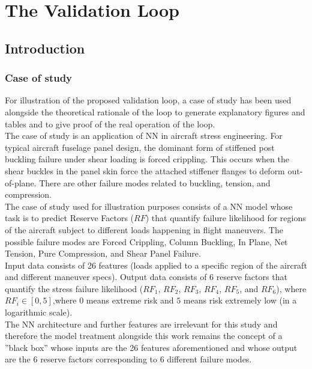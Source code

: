 \chapter{The Validation Loop}
%
\label{chap:Chap_1}
%
%
\section{Introduction}
\subsection{Case of study}
\indent For illustration of the proposed validation loop, a case of study has been used alongside the theoretical rationale of the loop to generate explanatory figures and tables and to give proof of the real operation of the loop.\\
%
\indent The case of study is an application of NN in aircraft stress engineering. For typical aircraft fuselage panel design, the dominant form of stiffened post buckling failure under shear loading is forced crippling\cite{bijlaard1955buckling}. This occurs when the shear buckles in the panel skin force the attached stiffener flanges to deform out-of-plane. There are other failure modes related to buckling, tension, and compression.\\
%
\indent The case of study used for illustration purposes consists of a NN model whose task is to predict Reserve Factors ($RF$) that quantify failure likelihood for regions of the aircraft subject to different loads happening in flight maneuvers. The possible failure modes are Forced Crippling, Column Buckling, In Plane, Net Tension, Pure Compression, and Shear Panel Failure.\\
%
\indent Input data consists of 26 features (loads applied to a specific region of the aircraft and different maneuver specs). Output data consists of 6 reserve factors that quantify the stress failure likelihood ($RF_1$, $RF_2$, $RF_3$, $RF_4$, $RF_5$, and $RF_6$), where $RF_i\in [0,5]$,where $0$ means extreme risk and $5$ means risk extremely low (in a logarithmic scale).\\
%
\indent The NN architecture and further features are irrelevant for this study and therefore the model treatment alongside this work remains the concept of a ''black box'' whose inputs are the 26 features aforementioned and whose output are the 6 reserve factors corresponding to 6 different failure modes.\\
